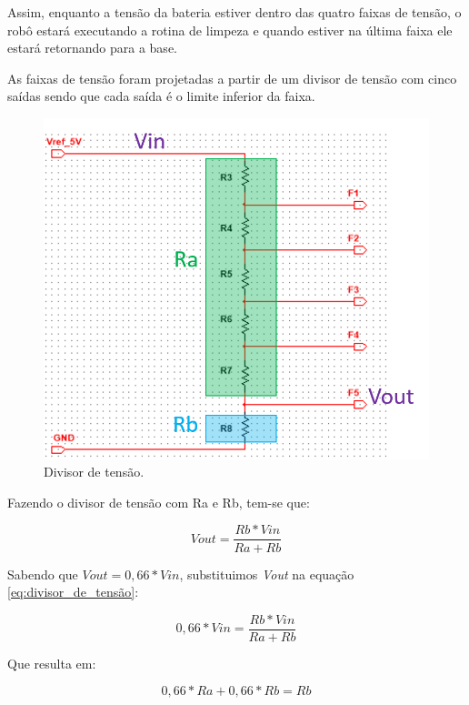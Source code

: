 		Assim, enquanto a tensão da bateria estiver dentro das quatro faixas de tensão, o robô estará executando a rotina de limpeza e quando estiver na última faixa ele estará retornando para a base. 

		As faixas de tensão foram projetadas a partir de um divisor de tensão com cinco saídas sendo que cada saída é o limite inferior da faixa.

		\begin{figure}[H]
			\centering
			\includegraphics[scale=0.5]{figuras/Divisor1.png}
			\caption{Divisor de tensão.}
			\label{img:divisor_de_tensão}
		\end{figure}

		Fazendo o divisor de tensão com Ra e Rb, tem-se que:

		\begin{equation}
		\label{eq:divisor_de_tensão}
			Vout= \frac{Rb * Vin}{Ra + Rb} 
		\end{equation}

		Sabendo que ${Vout = 0,66 * Vin}$, substituimos \textit{Vout} na equação \ref{eq:divisor_de_tensão}:
		
		\begin{equation}
		\label{eq:divisor_de_tensão_2}
			0,66 *Vin=\frac{Rb *Vin}{Ra + Rb} 
		\end{equation}

		Que resulta em:

		\begin{equation}
		\label{eq:divisor_de_tensão_3}
			0,66 * Ra + 0,66 * Rb = Rb
		\end{equation}

